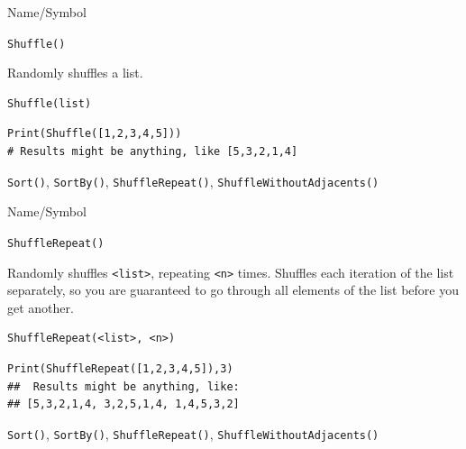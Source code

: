 \begin{desc}{Name/Symbol}
\item[Name/Symbol] 	\verb+Shuffle()+

\item[Description] 	Randomly shuffles a list.

\item[Usage]    
\begin{verbatim}
Shuffle(list)
\end{verbatim}

\item[Example]
\begin{verbatim}
Print(Shuffle([1,2,3,4,5]))
# Results might be anything, like [5,3,2,1,4]
\end{verbatim}

\item[See Also]    	\verb+Sort()+, \verb+SortBy()+, \verb+ShuffleRepeat()+,
                    \verb+ShuffleWithoutAdjacents()+
\end{desc}



\begin{desc}{Name/Symbol}
\item[Name/Symbol] 	\verb+ShuffleRepeat()+

\item[Description] 	Randomly shuffles  \verb+<list>+, repeating \verb+<n>+ times.  Shuffles
  each iteration of the list separately, so you are guaranteed to go
  through all elements of the list before you get another.

\item[Usage]    
\begin{verbatim}
ShuffleRepeat(<list>, <n>)
\end{verbatim}

\item[Example]
\begin{verbatim}
Print(ShuffleRepeat([1,2,3,4,5]),3)
##  Results might be anything, like:
## [5,3,2,1,4, 3,2,5,1,4, 1,4,5,3,2]
\end{verbatim}

\item[See Also]    	\verb+Sort()+, \verb+SortBy()+, \verb+ShuffleRepeat()+,
                    \verb+ShuffleWithoutAdjacents()+
\end{desc}



